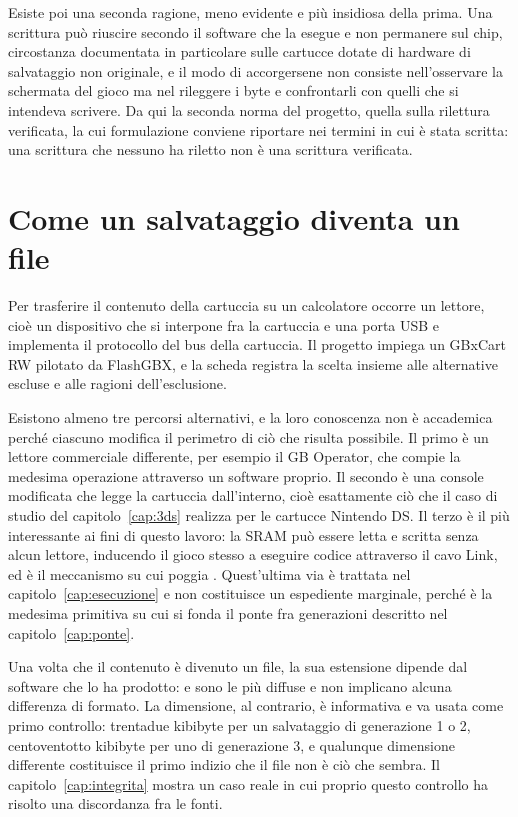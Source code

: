 Esiste poi una seconda ragione, meno evidente e più insidiosa della prima. Una scrittura può riuscire secondo il software che la esegue e non permanere sul chip, circostanza documentata in particolare sulle cartucce dotate di hardware di salvataggio non originale, e il modo di accorgersene non consiste nell'osservare la schermata del gioco ma nel rileggere i byte e confrontarli con quelli che si intendeva scrivere. Da qui la seconda norma del progetto, quella sulla rilettura verificata, la cui formulazione conviene riportare nei termini in cui è stata scritta: una scrittura che nessuno ha riletto non è una scrittura verificata.

\section{Come un salvataggio diventa un file}

Per trasferire il contenuto della cartuccia su un calcolatore occorre un lettore, cioè un dispositivo che si interpone fra la cartuccia e una porta USB e implementa il protocollo del bus della cartuccia. Il progetto impiega un GBxCart RW pilotato da FlashGBX, e la scheda  registra la scelta insieme alle alternative escluse e alle ragioni dell'esclusione.

Esistono almeno tre percorsi alternativi, e la loro conoscenza non è accademica perché ciascuno modifica il perimetro di ciò che risulta possibile. Il primo è un lettore commerciale differente, per esempio il GB Operator, che compie la medesima operazione attraverso un software proprio. Il secondo è una console modificata che legge la cartuccia dall'interno, cioè esattamente ciò che il caso di studio del capitolo~\ref{cap:3ds} realizza per le cartucce Nintendo DS. Il terzo è il più interessante ai fini di questo lavoro: la SRAM può essere letta e scritta senza alcun lettore, inducendo il gioco stesso a eseguire codice attraverso il cavo Link, ed è il meccanismo su cui poggia  \cite{pksploit}. Quest'ultima via è trattata nel capitolo~\ref{cap:esecuzione} e non costituisce un espediente marginale, perché è la medesima primitiva su cui si fonda il ponte fra generazioni descritto nel capitolo~\ref{cap:ponte}.

Una volta che il contenuto è divenuto un file, la sua estensione dipende dal software che lo ha prodotto:  e  sono le più diffuse e non implicano alcuna differenza di formato. La dimensione, al contrario, è informativa e va usata come primo controllo: trentadue kibibyte per un salvataggio di generazione 1 o 2, centoventotto kibibyte per uno di generazione 3, e qualunque dimensione differente costituisce il primo indizio che il file non è ciò che sembra. Il capitolo~\ref{cap:integrita} mostra un caso reale in cui proprio questo controllo ha risolto una discordanza fra le fonti.


